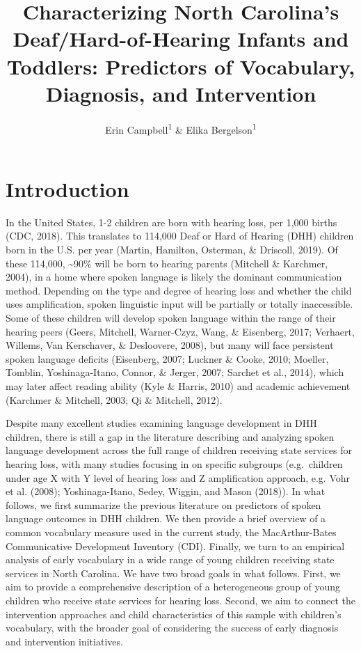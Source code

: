 \documentclass[english,man]{apa6}
\title{Characterizing North Carolina's Deaf/Hard-of-Hearing Infants and Toddlers: Predictors of Vocabulary, Diagnosis, and Intervention}
\author{Erin Campbell\textsuperscript{1} \& Elika Bergelson\textsuperscript{1}}
\date{}
\affiliation{\vspace{0.5cm}\textsuperscript{1} Duke University}
\begin{document}
\maketitle

\hypertarget{introduction}{%
\section{Introduction}\label{introduction}}

In the United States, 1-2 children are born with hearing loss, per 1,000 births (CDC, 2018). This translates to 114,000 Deaf or Hard of Hearing (DHH) children born in the U.S. per year (Martin, Hamilton, Osterman, \& Driscoll, 2019). Of these 114,000, \textasciitilde{}90\% will be born to hearing parents (Mitchell \& Karchmer, 2004), in a home where spoken language is likely the dominant communication method. Depending on the type and degree of hearing loss and whether the child uses amplification, spoken linguistic input will be partially or totally inaccessible. Some of these children will develop spoken language within the range of their hearing peers (Geers, Mitchell, Warner-Czyz, Wang, \& Eisenberg, 2017; Verhaert, Willems, Van Kerschaver, \& Desloovere, 2008), but many will face persistent spoken language deficits (Eisenberg, 2007; Luckner \& Cooke, 2010; Moeller, Tomblin, Yoshinaga-Itano, Connor, \& Jerger, 2007; Sarchet et al., 2014), which may later affect reading ability (Kyle \& Harris, 2010) and academic achievement (Karchmer \& Mitchell, 2003; Qi \& Mitchell, 2012).

Despite many excellent studies examining language development in DHH children, there is still a gap in the literature describing and analyzing spoken language development across the full range of children receiving state services for hearing loss, with many studies focusing in on specific subgroups (e.g.~children under age X with Y level of hearing loss and Z amplification approach, e.g. Vohr et al. (2008); Yoshinaga-Itano, Sedey, Wiggin, and Mason (2018)). In what follows, we first summarize the previous literature on predictors of spoken language outcomes in DHH children. We then provide a brief overview of a common vocabulary measure used in the current study, the MacArthur-Bates Communicative Development Inventory (CDI). Finally, we turn to an empirical analysis of early vocabulary in a wide range of young children receiving state services in North Carolina. We have two broad goals in what follows. First, we aim to provide a comprehensive description of a heterogeneous group of young children who receive state services for hearing loss. Second, we aim to connect the intervention approaches and child characteristics of this sample with children's vocabulary, with the broader goal of considering the success of early diagnosis and intervention initiatives.
\end{document}
